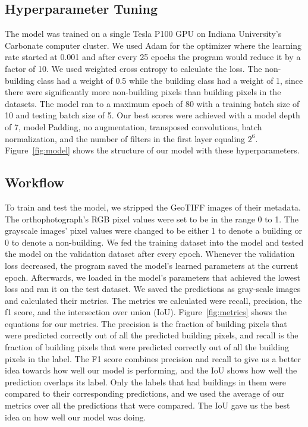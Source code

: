 \documentclass[acmtog, authorversion]{acmart}
\begin{document}
\subsection{Hyperparameter Tuning}
 The model was trained on a single Tesla P100 GPU on Indiana University’s Carbonate computer cluster. We used Adam\cite{kingma2014adam} for the optimizer where the learning rate started at 0.001 and after every 25 epochs the program would reduce it by a factor of 10. We used weighted cross entropy\cite{Raul2018, Pytorch2019} to calculate the loss. The non-building class had a weight of 0.5 while the building class had a weight of 1, since there were significantly more non-building pixels than building pixels in the datasets. The model ran to a maximum epoch of 80 with a training batch size of 10 and testing batch size of 5. Our best scores were achieved with a model depth of 7, model Padding, no augmentation, transposed convolutions, batch normalization, and the number of filters in the first layer equaling $2^6$. Figure~\ref{fig:model} shows the structure of our model with these hyperparameters.

\subsection{Workflow}
To train and test the model, we stripped the GeoTIFF images of their metadata. The orthophotograph's RGB pixel values were set to be in the range 0 to 1. The grayscale images’ pixel values were changed to be either 1 to denote a building or 0 to denote a non-building. We fed the training dataset into the model and tested the model on the validation dataset after every epoch. Whenever the validation loss decreased, the program saved the model’s learned parameters at the current epoch. Afterwards, we loaded in the model’s parameters that achieved the lowest loss and ran it on the test dataset. We saved the predictions as gray-scale images and calculated their metrics. The metrics we calculated were recall, precision, the f1 score, and the intersection over union (IoU). Figure~\ref{fig:metrics} shows the equations for our metrics. The precision is the fraction of building pixels that were predicted correctly out of all the predicted building pixels, and recall is the fraction of building pixels that were predicted correctly out of all the building pixels in the label. The F1 score combines precision and recall to give us a better idea towards how well our model is performing, and the IoU shows how well the prediction overlaps its label. Only the labels that had buildings in them were compared to their corresponding predictions, and we used the average of our metrics over all the predictions that were compared. The IoU gave us the best idea on how well our model was doing.
\end{document}
